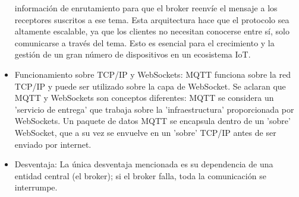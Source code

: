 \documentclass{report}
\begin{document}
\begin{itemize}
    información de enrutamiento para que el broker reenvíe el mensaje a los receptores suscritos a ese tema. Esta arquitectura hace que 
    el protocolo sea altamente escalable, ya que los clientes no necesitan conocerse entre sí, solo comunicarse a través del tema. Esto 
    es esencial para el crecimiento y la gestión de un gran número de dispositivos en un ecosistema IoT.
    \item Funcionamiento sobre TCP/IP y WebSockets: MQTT funciona sobre la red TCP/IP y puede ser utilizado sobre la capa de WebSocket. 
    Se aclaran que MQTT y WebSockets son conceptos diferentes: MQTT se considera un 'servicio de entrega' que trabaja sobre la 
    'infraestructura' proporcionada por WebSockets. Un paquete de datos MQTT se encapsula dentro de un 'sobre' WebSocket, que a su vez 
    se envuelve en un 'sobre' TCP/IP antes de ser enviado por internet.
    \item Desventaja: La única desventaja mencionada es su dependencia de una entidad central (el broker); si el broker falla, toda la 
    comunicación se interrumpe.
\end{itemize}
\end{document}
